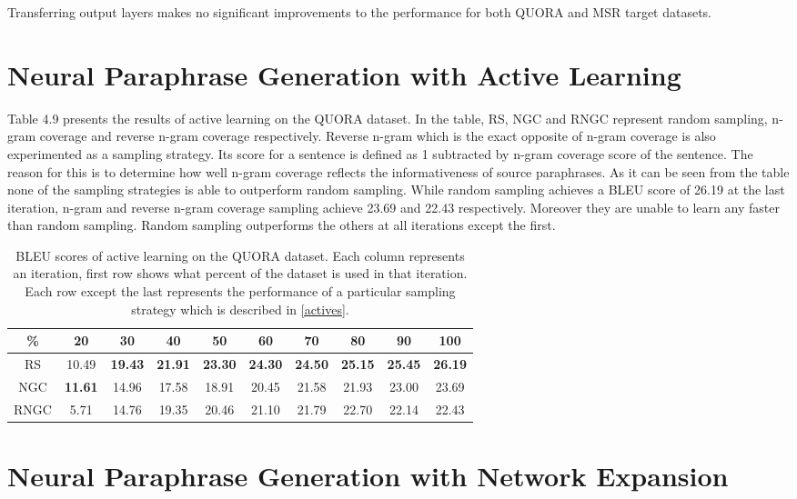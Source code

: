 Transferring output layers makes no significant improvements to the performance for both QUORA and MSR target datasets.


\section{Neural Paraphrase Generation with Active Learning}

Table 4.9 presents the results of active learning on the QUORA dataset. In the table, RS, NGC and RNGC represent random sampling, n-gram coverage and reverse n-gram coverage respectively. Reverse n-gram which is the exact opposite of n-gram coverage is also experimented as a sampling strategy. Its score for a sentence is defined as 1 subtracted by n-gram coverage score of the sentence. The reason for this is to determine how well n-gram coverage reflects the informativeness of source paraphrases. As it can be seen from the table none of the sampling strategies is able to outperform random sampling. While random sampling achieves a BLEU score of 26.19 at the last iteration, n-gram and reverse n-gram coverage sampling achieve 23.69 and 22.43 respectively. Moreover they are unable to learn any faster than random sampling. Random sampling outperforms the others at all iterations except the first.

\begin{table}[t]
\centering
\small
 \begin{tabular}{|c | c | c | c | c | c | c | c | c | c |} 
 \hline
 \% & 20 & 30 & 40 & 50 & 60 & 70 & 80 & 90 & 100 \\ [0.5ex] 
 \hline
  RS & 10.49 &  \textbf{19.43} & \textbf{21.91} &  \textbf{23.30} &  \textbf{24.30} &  \textbf{24.50} &  \textbf{25.15} &  \textbf{25.45} &  \textbf{26.19}  \\ 
 \hline
  NGC &  \textbf{11.61} & 14.96 & 17.58 & 18.91 & 20.45 & 21.58 & 21.93 & 23.00 & 23.69 \\ 
 \hline
 RNGC & 5.71 & 14.76 & 19.35 & 20.46 & 21.10 & 21.79 & 22.70 & 22.14 & 22.43 \\ 
 \hline
\end{tabular}
\caption{BLEU scores of active learning on the QUORA dataset. Each column represents an iteration, first row shows what percent of the dataset is used in that iteration. Each row except the last represents the performance of a particular sampling strategy which is described in \ref{actives}.}
\end{table}

\section{Neural Paraphrase Generation with Network Expansion}

